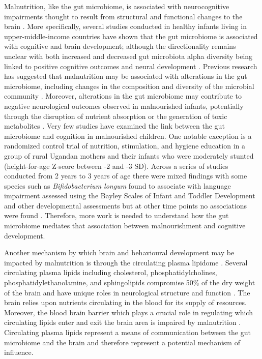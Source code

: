 \documentclass{article}
\begin{document}
Malnutrition, like the gut microbiome, is associated with neurocognitive impairments thought to result from structural and functional changes to the brain \cite{acuna2021infant, carlson2018infant, kar2008cognitive, kort2021model, roger2022impact, udani1992protein}.
More specifically, several studies conducted in healthy infants living in upper-middle-income countries have shown that the gut microbiome is associated with cognitive and brain development; although the directionality remains unclear with both increased and decreased gut microbiota alpha diversity being linked to positive cognitive outcomes and neural development \cite{kelsey2021gut, carlson2018infant,gao2019gut,vaher2022microbiome}.
Previous research has suggested that malnutrition may be associated with alterations in the gut microbiome, including changes in the composition and diversity of the microbial community \cite{kane2015childhood}.
Moreover, alterations in the gut microbiome may contribute to negative neurological outcomes observed in malnourished infants, potentially through the disruption of nutrient absorption or the generation of toxic metabolites \cite{goyal2015feeding}.
Very few studies have examined the link between the gut microbiome and cognition in malnourished children.
One notable exception is a randomized control trial of nutrition, stimulation, and hygiene education in a group of rural Ugandan mothers and their infants who were moderately stunted (height-for-age Z-score between -2 and -3 SD).
Across a series of studies conducted from 2 years to 3 years of age there were mixed findings with some species such as \textit{Bifidobacterium longum} found to associate with language impairment assessed using the Bayley Scales of Infant and Toddler Development and other developmental assessments but at other time points no associations were found \cite{kort2021model, atukunda2019child, iversen2020no}.
Therefore, more work is needed to understand how the gut microbiome mediates that association between malnourishment and cognitive development.

Another mechanism by which brain and behavioural development may be impacted by malnutrition is through the circulating plasma lipidome \cite{das1984plasma, veiga2010dyslipidaemia}.
Several circulating plasma lipids including cholesterol, phosphatidylcholines, phosphatidylethanolamine, and sphingolipids compromise 50\% of the dry weight of the brain and have unique roles in neurological structure and function \cite{hornemann2021mini}.
The brain relies upon nutrients circulating in the blood for its supply of resources.
Moreover, the blood brain barrier which plays a crucial role in regulating which circulating lipids enter and exit the brain area is impaired by malnutrition \cite{de2019effect}.
Circulating plasma lipids represent a means of communication between the gut microbiome and the brain \cite{lamichhane2021linking} and therefore represent a potential mechanism of influence.
\end{document}
